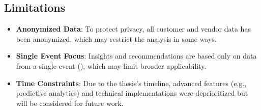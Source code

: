 \subsection*{Limitations}
\label{subsec:introduction-limitations}
\begin{itemize}
	\item \textbf{Anonymized Data}: To protect privacy, all customer and vendor data has been anonymized, which may restrict the analysis in some ways.
	\item \textbf{Single Event Focus}: Insights and recommendations are based only on data from a single event (\theEvent), which may limit broader applicability.
	\item \textbf{Time Constraints}: Due to the thesis's timeline, advanced features (e.g., predictive analytics) and technical implementations were deprioritized but will be considered for future work.
\end{itemize}
